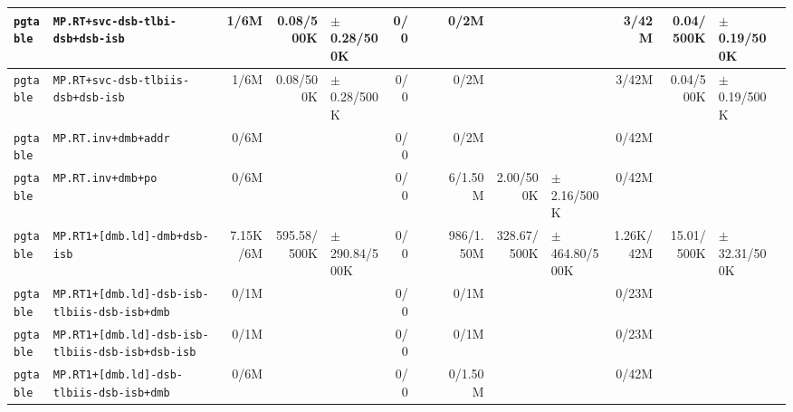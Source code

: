 \begin{tabular}{l l  | r r l | r r l | r r l | r r l l}
        \verb|pgtable| &                       \verb|MP.RT+svc-dsb-tlbi-dsb+dsb-isb| &           1/6M &             0.08/500K &   $\pm$ 0.28/500K &            0/0 &                       &  &           0/2M &                       &                   &          3/42M &             0.04/500K &    $\pm$ 0.19/500K & \\ \hline 
        \verb|pgtable| &                     \verb|MP.RT+svc-dsb-tlbiis-dsb+dsb-isb| &           1/6M &             0.08/500K &   $\pm$ 0.28/500K &            0/0 &                       &  &           0/2M &                       &                   &          3/42M &             0.04/500K &    $\pm$ 0.19/500K & \\ \hline 
        \verb|pgtable| &                                   \verb|MP.RT.inv+dmb+addr| &           0/6M &                       &                   &            0/0 &                       &  &           0/2M &                       &                   &          0/42M &                       &                    & \\ \hline 
        \verb|pgtable| &                                     \verb|MP.RT.inv+dmb+po| &           0/6M &                       &                   &            0/0 &                       &  &        6/1.50M &             2.00/500K &   $\pm$ 2.16/500K &          0/42M &                       &                    & \\ \hline 
        \verb|pgtable| &                          \verb|MP.RT1+[dmb.ld]-dmb+dsb-isb| &       7.15K/6M &           595.58/500K & $\pm$ 290.84/500K &            0/0 &                       &  &      986/1.50M &           328.67/500K & $\pm$ 464.80/500K &      1.26K/42M &            15.01/500K &   $\pm$ 32.31/500K & \\ \hline 
        \verb|pgtable| &           \verb|MP.RT1+[dmb.ld]-dsb-isb-tlbiis-dsb-isb+dmb| &           0/1M &                       &                   &            0/0 &                       &  &           0/1M &                       &                   &          0/23M &                       &                    & \\ \hline 
        \verb|pgtable| &       \verb|MP.RT1+[dmb.ld]-dsb-isb-tlbiis-dsb-isb+dsb-isb| &           0/1M &                       &                   &            0/0 &                       &  &           0/1M &                       &                   &          0/23M &                       &                    & \\ \hline 
        \verb|pgtable| &               \verb|MP.RT1+[dmb.ld]-dsb-tlbiis-dsb-isb+dmb| &           0/6M &                       &                   &            0/0 &                       &  &        0/1.50M &                       &                   &          0/42M &                       &                    & \\ \hline 

\end{tabular}
